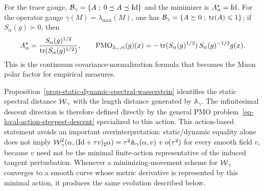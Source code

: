 For the trace gauge, $\mathcal B_\gamma=\left\{ A \;;\; 0\preceq A\preceq\mathrm{Id} \right\}$ and the minimizer is $A_\alpha^\star=\mathrm{Id}$. For the operator gauge $\gamma(M)=\lambda_{\max}(M)$, one has $\mathcal B_\gamma=\left\{ A\succeq0 \;;\; \operatorname{tr}(A)\leqslant1 \right\}$; if $S_\alpha(g)\succ0$, then
\[
	A_\alpha^\star
	=
	\frac{S_\alpha(g)^{1/2}}{\operatorname{tr}(S_\alpha(g)^{1/2})},
	\qquad
	\operatorname{PMO}_{\mathbb A_\gamma,\alpha}(g)(x)
	=
	-\operatorname{tr}(S_\alpha(g)^{1/2})\,S_\alpha(g)^{-1/2}g(x).
\]
This is the continuum covariance-normalization formula that becomes the Muon polar factor for empirical measures.

Proposition~\ref{prop-static-dynamic-spectral-wasserstein} identifies the static spectral distance $\operatorname{\mathcal{W}}_\gamma$ with the length distance generated by $\mathbb A_\gamma$. The infinitesimal descent direction is therefore defined directly by the general PMO problem~\eqref{eq-local-action-steepest-descent} specialized to this action. This action-based statement avoids an important overinterpretation: static/dynamic equality alone does not imply
\(\operatorname{\mathcal{W}}_\gamma^2(\alpha,(\mathrm{Id}+\tau v)_\sharp\alpha)=\tau^2\mathbb A_\gamma(\alpha,v)+o(\tau^2)\)
for every smooth field $v$, because $v$ need not be the minimal finite-action representative of the induced tangent perturbation. Whenever a minimizing-movement scheme for $\operatorname{\mathcal{W}}_\gamma$ converges to a smooth curve whose metric derivative is represented by this minimal action, it produces the same evolution described below.

